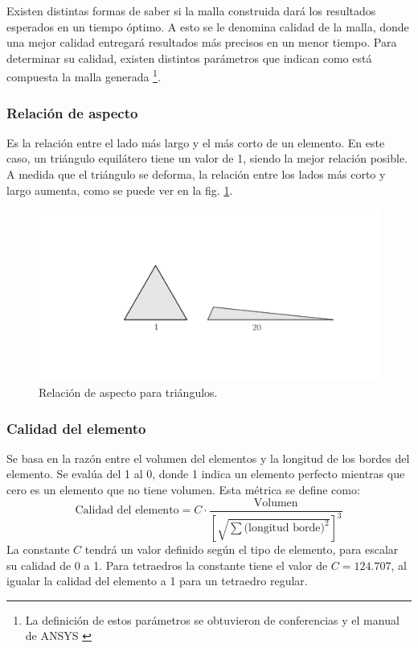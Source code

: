 Existen distintas formas de saber si la malla construida dará los resultados esperados en un tiempo óptimo. A esto se le denomina calidad de la malla, donde una mejor calidad entregará resultados más precisos en un menor tiempo. Para determinar su calidad, existen distintos parámetros que indican como está compuesta la malla generada \footnote{La definición de estos parámetros se obtuvieron de conferencias y el manual de ANSYS \cite{sharcnet_2017}\cite{ansys_2015}}.

\subsubsection{Relación de aspecto}
Es la relación entre el lado más largo y el más corto de un elemento. En este caso, un triángulo equilátero tiene un valor de 1, siendo la mejor relación posible. A medida que el triángulo se deforma, la relación entre los lados más corto y largo aumenta, como se puede ver en la fig. \ref{fig:asp_ratio}.

\begin{figure}[h]
\centering
\includegraphics[width=0.5\linewidth, trim={12cm 7cm 6.5cm 7.5cm}, clip]{Imagenes/asp_ratio.pdf}
\caption{Relación de aspecto para triángulos.}
\label{fig:asp_ratio}
\end{figure}

\subsubsection{Calidad del elemento}
Se basa en la razón entre el volumen del elementos y la longitud de los bordes del elemento. Se evalúa del 1 al 0, donde 1 indica un elemento perfecto mientras que cero es un elemento que no tiene volumen. Esta métrica se define como:
\begin{equation}
	\text{Calidad del elemento} = C \cdot \frac{\text{Volumen}}{\left[\sqrt{\sum \text{(longitud borde)}^2}\right]^3}
\end{equation}
La constante $C$ tendrá un valor definido según el tipo de elemento, para escalar su calidad de 0 a 1. Para tetraedros la constante tiene el valor de $C=124.707$, al igualar la calidad del elemento a 1 para un tetraedro regular.


